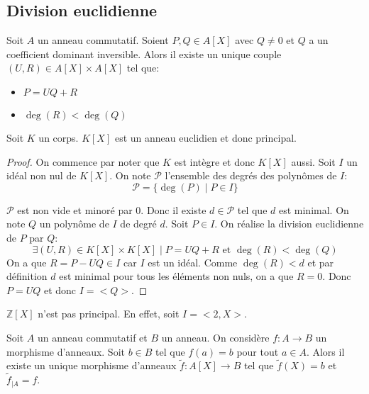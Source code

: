 \subsection{Division euclidienne}

\begin{prop}
	Soit $A$ un anneau commutatif. Soient $P, Q \in A[X]$ avec $Q \neq 0$ et
	$Q$ a un coefficient dominant inversible. Alors il existe un unique couple
	$(U, R) \in A[X] \times A[X]$ tel que:
	\begin{itemize}
		\item $P = UQ + R$
		\item $\deg(R) < \deg(Q)$
	\end{itemize}
\end{prop}

\begin{prop}
	Soit $K$ un corps. $K[X]$ est un anneau euclidien et donc principal.
\end{prop}

\begin{proof}
	On commence par noter que $K$ est intègre et donc $K[X]$ aussi.
	Soit $I$ un idéal non nul de $K[X]$. On note $\mathcal{P}$ l'ensemble des degrés des polynômes de $I$:
	\[\mathcal{P} = \{ \deg(P) \mid P \in I \}\]

	$\mathcal{P}$ est non vide et minoré par $0$. Donc il existe $d \in \mathcal{P}$ tel que $d$ est minimal.
	On note $Q$ un polynôme de $I$ de degré $d$. Soit $P \in I$. On réalise la division euclidienne de $P$ par $Q$:
	\[ \exists (U, R) \in K[X] \times K[X] \mid P = UQ + R \text{ et } \deg(R) < \deg(Q) \]
	On a que $R = P - UQ \in I$  car $I$ est un idéal. Comme $\deg(R) < d$ et par définition $d$ est minimal pour
	tous les éléments non nuls, on a que $R = 0$. Donc $P = UQ$ et donc $I = <Q>$.
\end{proof}


\begin{exemple}
	$\mathbb{Z}[X]$ n'est pas principal. En effet, soit $I = <2, X>$.
\end{exemple}

\begin{theorem} \label{thm:prop_univ_anneau_poly}
	\label{thm:prop_univ_anneau_poly}
	Soit $A$ un anneau commutatif et $B$ un anneau. On considère $f: A \to B$ un morphisme d'anneaux.
	Soit $b \in B$ tel que $f(a) = b$ pour tout $a \in A$. Alors il existe un unique morphisme d'anneaux
	$\tilde{f}: A[X] \to B$ tel que $\tilde{f}(X) = b$ et $\tilde{f}_{|A} = f$.
\end{theorem}

